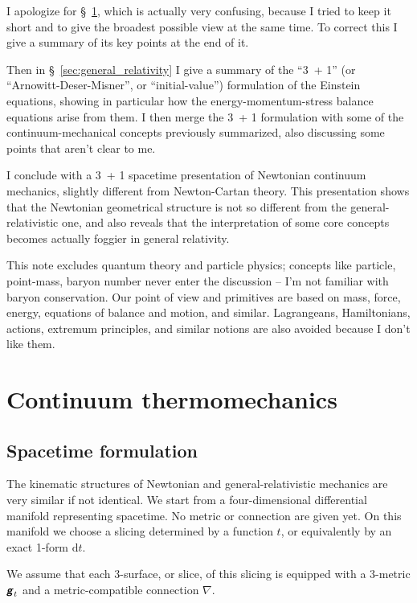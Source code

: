 \documentclass[\ifafour a4paper,12pt,\else a5paper,10pt,\fi%
onecolumn,oneside,article,%
british%
]{memoir}
\theoremstyle{remark}
\theoremstyle{innote}
\newcommand*{\mathte}[1]{\textbf{\textit{\textsf{#1}}}}
\newcommand*{\di}{\mathrm{d}}%
\renewcommand*{\|}[1][]{\nonscript\,#1\vert\nonscript\;\mathopen{}}
\newcommand*{\sect}{\S}%
\newcommand*{\ygg}{g}
\newcommand*{\yg}{\mathte{\ygg}}
\newcommand*{\ynab}{\nabla}
\begin{document}
I apologize for \sect~\ref{sec:newtonian_continuum_thermomechanics}, which
is actually very confusing, because I tried to keep it short and to give
the broadest possible view at the same time. To correct this I give a
summary of its key points at the end of it.

Then in \sect~\ref{sec:general_relativity} I give a summary of the
\enquote{3~+ 1} (or \enquote{Arnowitt-Deser-Misner}, or
\enquote{initial-value}) formulation of the Einstein equations, showing in
particular how the energy-momentum-stress balance equations arise from
them. I then merge the 3~+ 1 formulation with some of the
continuum-mechanical concepts previously summarized, also discussing some
points that aren't clear to me.

I conclude with a 3~+ 1 spacetime presentation of Newtonian continuum
mechanics, slightly different from Newton-Cartan theory. This presentation
shows that the Newtonian geometrical structure is not so different from the
general-relativistic one, and also reveals that the interpretation of some
core concepts becomes actually foggier in general relativity.

This note excludes quantum theory and particle physics; concepts like
particle, point-mass, baryon number never enter the discussion -- I'm not
familiar with baryon conservation. Our point of view and primitives are
based on mass, force, energy, equations of balance and motion, and similar.
Lagrangeans, Hamiltonians, actions, extremum principles, and similar
notions are also avoided because I don't like them.


\section{Continuum thermomechanics}
\label{sec:newtonian_continuum_thermomechanics}


\subsection{Spacetime formulation}
\label{sec:newtonian_mechanics_spacetime}

The kinematic structures of Newtonian and general-relativistic mechanics
are very similar if not identical. We start from a four-dimensional
differential manifold representing spacetime. No metric or connection are
given yet. On this manifold we choose a slicing determined by a function
$t$, or equivalently by an exact 1-form $\di t$.


We assume that each 3-surface, or slice, of this slicing is equipped with
a 3-metric $\yg_t$ and a metric-compatible connection $\ynab$.
\end{document}
